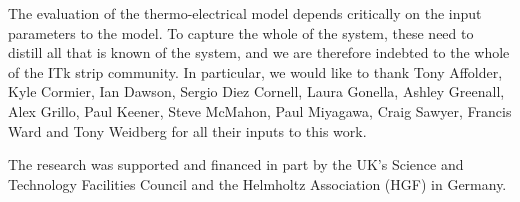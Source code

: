 The evaluation of the thermo-electrical model depends critically on the input parameters to the model. To capture the whole of the system, these need to distill all that is known of the system, and we are therefore indebted to the whole of the ITk strip community. In particular, we would like to thank Tony Affolder, Kyle Cormier, Ian Dawson, Sergio Diez Cornell, Laura Gonella, Ashley Greenall, Alex Grillo, Paul Keener, Steve McMahon, Paul Miyagawa, Craig Sawyer, Francis Ward and Tony Weidberg for all their inputs to this work.

The research was supported and financed in part by the UK's Science and Technology Facilities Council and the Helmholtz Association (HGF) in Germany.
